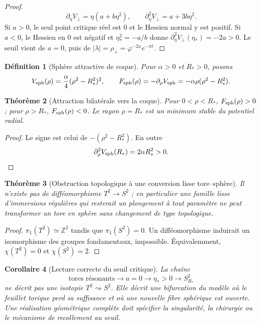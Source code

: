 \documentclass[11pt,a4paper]{article}
\newtheorem{theorem}{Théorème}[section]
\newtheorem{corollary}[theorem]{Corollaire}
\newtheorem{definition}[theorem]{Définition}
\newcommand{\Z}{\mathbb Z}
\newcommand{\ph}{\varphi}
\begin{document}
\begin{proof}
\[
 \partial_\eta V_\perp=\eta(a+b\eta^2),
 \qquad
 \partial_\eta^2V_\perp=a+3b\eta^2.
\]
Si $a>0$, le seul point critique réel est $0$ et le Hessien normal y est positif. Si $a<0$, le Hessien en $0$ est négatif et $\eta_*^2=-a/b$ donne $\partial_\eta^2V_\perp(\eta_*)=-2a>0$. Le seuil vient de $a=0$, puis de $|\lambda|=\rho_+=\ph^{-2x}e^{-\pi t}$.
\end{proof}

\begin{definition}[Sphère attractive de coque]
Pour $\alpha>0$ et $R_*>0$, posons
\[
 V_{\rm sph}(\rho)=\frac\alpha4(\rho^2-R_*^2)^2,
\qquad
 F_{\rm sph}(\rho)=-\partial_\rho V_{\rm sph}
 =-\alpha\rho(\rho^2-R_*^2).
\]
\end{definition}

\begin{theorem}[Attraction bilatérale vers la coque]\label{thm:shell}
Pour $0<\rho<R_*$, $F_{\rm sph}(\rho)>0$ ; pour $\rho>R_*$, $F_{\rm sph}(\rho)<0$. Le rayon $\rho=R_*$ est un minimum stable du potentiel radial.
\end{theorem}

\begin{proof}
Le signe est celui de $-(\rho^2-R_*^2)$. En outre
\[
 \partial_\rho^2V_{\rm sph}(R_*)=2\alpha R_*^2>0.
\]
\end{proof}

\begin{theorem}[Obstruction topologique à une conversion lisse tore--sphère]\label{thm:noisotopy}
Il n'existe pas de difféomorphisme $T^2\to S^2$ ; en particulier une famille lisse d'immersions régulières qui resterait un plongement à tout paramètre ne peut transformer un tore en sphère sans changement de type topologique.
\end{theorem}

\begin{proof}
$\pi_1(T^2)\simeq\Z^2$ tandis que $\pi_1(S^2)=0$. Un difféomorphisme induirait un isomorphisme des groupes fondamentaux, impossible. Équivalemment, $\chi(T^2)=0$ et $\chi(S^2)=2$.
\end{proof}

\begin{corollary}[Lecture correcte du seuil critique]
La chaîne
\[
 \text{tores résonants}\longrightarrow a=0\longrightarrow \eta_*>0
 \longrightarrow S^2_{R_*}
\]
ne décrit pas une isotopie $T^2\rightsquigarrow S^2$. Elle décrit une bifurcation du modèle où le feuillet torique perd sa suffisance et où une nouvelle fibre sphérique est ouverte. Une réalisation géométrique complète doit spécifier la singularité, la chirurgie ou le mécanisme de recollement au seuil.
\end{corollary}
\end{document}
